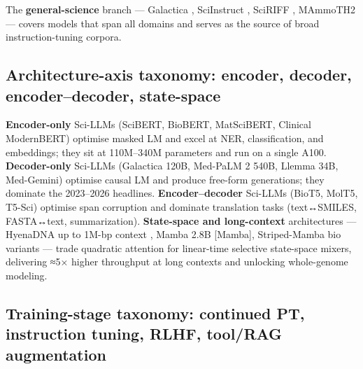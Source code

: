 \documentclass{article}
\begin{document}
The \textbf{general-science} branch --- Galactica \cite{taylor2022arxiv2211090852022}, SciInstruct \cite{zhang2024sciinstructaselfre}, SciRIFF \cite{wadden2024sciriffaresourceto}, MAmmoTH2 \cite{yue2024mammoth2scalingins} --- covers models that span all domains and serves as the source of broad instruction-tuning corpora.

\subsection{Architecture-axis taxonomy: encoder, decoder, encoder--decoder, state-space}\label{architecture-axis-taxonomy-encoder-decoder-encoderdecoder-state-space}

\textbf{Encoder-only} Sci-LLMs (SciBERT, BioBERT, MatSciBERT, Clinical ModernBERT) optimise masked LM and excel at NER, classification, and embeddings; they sit at 110M--340M parameters and run on a single A100. \textbf{Decoder-only} Sci-LLMs (Galactica 120B, Med-PaLM 2 540B, Llemma 34B, Med-Gemini) optimise causal LM and produce free-form generations; they dominate the 2023--2026 headlines. \textbf{Encoder--decoder} Sci-LLMs (BioT5, MolT5, T5-Sci) optimise span corruption and dominate translation tasks (text↔SMILES, FASTA↔text, summarization). \textbf{State-space and long-context} architectures --- HyenaDNA up to 1M-bp context \cite{nguyen2023hyenadnalongrangeg}, Mamba 2.8B {[}Mamba{]}, Striped-Mamba bio variants --- trade quadratic attention for linear-time selective state-space mixers, delivering ≈5× higher throughput at long contexts and unlocking whole-genome modeling.

\subsection{Training-stage taxonomy: continued PT, instruction tuning, RLHF, tool/RAG augmentation}\label{training-stage-taxonomy-continued-pt-instruction-tuning-rlhf-toolrag-augmentation}
\end{document}
